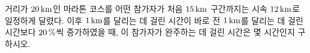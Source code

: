 거리가 $20\mkern3mu \mathrm{km}$인 마라톤 코스를 어떤 참가자가 처음 $15\mkern3mu \mathrm{km}$ 구간까지는 시속 $12\mkern3mu \mathrm{km}$로 일정하게 달렸다. 이후 $1\mkern3mu \mathrm{km}$를 달리는 데 걸린 시간이 바로 전 $1\mkern3mu \mathrm{km}$를 달리는 데 걸린 시간보다 $20\mkern3mu \%$씩 증가하였을 때, 이 참가자가 완주하는 데 걸린 시간은 몇 시간인지 구하시오. 
